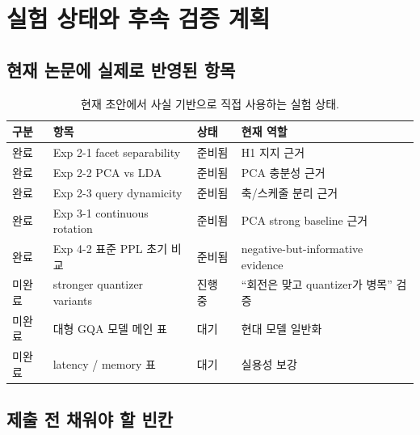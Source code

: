 \section{실험 상태와 후속 검증 계획}

\subsection{현재 논문에 실제로 반영된 항목}

\begin{table}[h]
\centering
\caption{현재 초안에서 사실 기반으로 직접 사용하는 실험 상태.}
\label{tab:status}
\small
\begin{tabularx}{\linewidth}{@{}l l l X@{}}
\toprule
\textbf{구분} & \textbf{항목} & \textbf{상태} & \textbf{현재 역할} \\
\midrule
완료 & Exp 2-1 facet separability & 준비됨 & H1 지지 근거 \\
완료 & Exp 2-2 PCA vs LDA & 준비됨 & PCA 충분성 근거 \\
완료 & Exp 2-3 query dynamicity & 준비됨 & 축/스케줄 분리 근거 \\
완료 & Exp 3-1 continuous rotation & 준비됨 & PCA strong baseline 근거 \\
완료 & Exp 4-2 표준 PPL 초기 비교 & 준비됨 & negative-but-informative evidence \\
미완료 & stronger quantizer variants & 진행 중 & ``회전은 맞고 quantizer가 병목'' 검증 \\
미완료 & 대형 GQA 모델 메인 표 & 대기 & 현대 모델 일반화 \\
미완료 & latency / memory 표 & 대기 & 실용성 보강 \\
\bottomrule
\end{tabularx}
\end{table}

\subsection{제출 전 채워야 할 빈칸}



